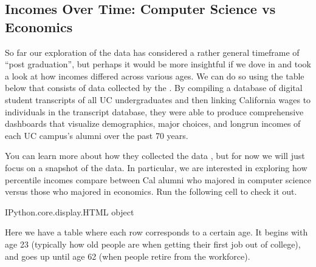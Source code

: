 \documentclass[letterpaper,10pt,english]{jupyterBook}
\begin{document}
\subsection{Incomes Over Time: Computer Science vs Economics}
\label{\detokenize{content/00-intro/index:incomes-over-time-computer-science-vs-economics}}
\sphinxAtStartPar
So far our exploration of the data has considered a rather general timeframe of “post graduation”, but perhaps it would be more insightful if we dove in and took a look at how incomes differed across various ages. We can do so using the table below that consists of data collected by the .
By compiling a database of digital student transcripts of all UC undergraduates and then linking California wages to individuals in the transcript database,
they were able to produce comprehensive dashboards that visualize demographics, major choices, and long\sphinxhyphen{}run incomes of each UC campus’s alumni over the past 70 years.

\sphinxAtStartPar
You can learn more about how they collected the data , but for now we will just focus on a snapshot of the data.
In particular, we are interested in exploring how percentile incomes compare between Cal alumni who majored in computer science versus those who majored in economics. Run the following cell to check it out.

\begin{sphinxVerbatim}[commandchars=\\\{\}]
\end{sphinxVerbatim}

\begin{sphinxVerbatim}[commandchars=\\\{\}]
\PYGZlt{}IPython.core.display.HTML object\PYGZgt{}
\end{sphinxVerbatim}

\sphinxAtStartPar
Here we have a table where each row corresponds to a certain age.
It begins with age 23 (typically how old people are when getting their first job out of college), and goes up until age 62 (when people retire from the workforce).
\end{document}
